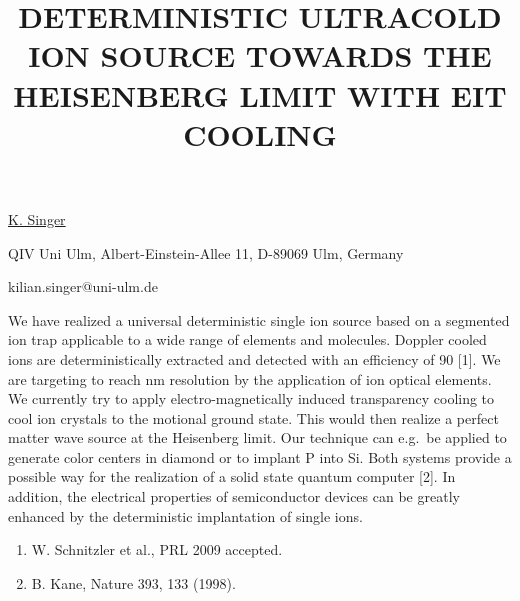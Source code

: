 \title{DETERMINISTIC ULTRACOLD ION SOURCE TOWARDS THE \mbox{HEISENBERG} LIMIT WITH EIT COOLING}

\underline{K. Singer} 

{\normalsize{\vspace{-4mm}
QIV Uni Ulm, Albert-Einstein-Allee 11, D-89069 Ulm, Germany

\email kilian.singer@uni-ulm.de}}

We have realized a universal deterministic single ion source based
on a segmented ion trap applicable to a wide range of elements and
molecules. Doppler cooled ions are deterministically extracted and
detected with an efficiency of 90 [1].
We are targeting to reach nm resolution by the application of ion
optical elements. We currently try to apply electro-magnetically
induced transparency cooling to cool ion crystals to the motional
ground state. This would then realize a perfect matter wave source
at the Heisenberg limit. Our technique can e.g.~be applied to
generate color centers in diamond or to implant P into Si. Both
systems provide a possible way for the realization of a solid state
quantum computer [2]. In addition, the electrical properties of
semiconductor devices can be greatly enhanced by the deterministic
implantation of single ions. %

{\normalsize
\begin{enumerate}
\item W. Schnitzler et al., PRL 2009 accepted.
\item B. Kane, Nature 393, 133 (1998).
\end{enumerate}
}

\vspace{\baselineskip}